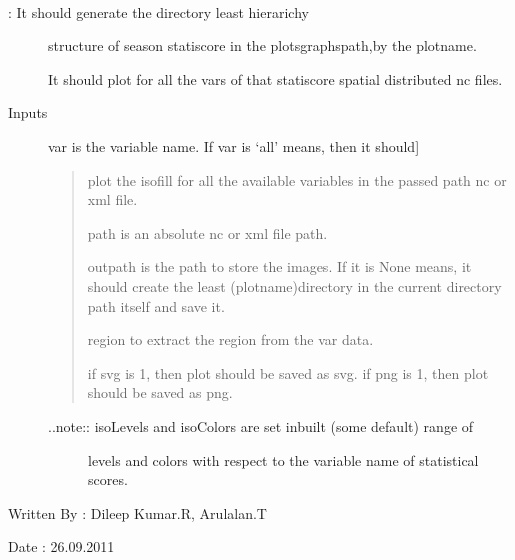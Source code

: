 \documentclass[letterpaper,10pt,english]{sphinxmanual}
\begin{document}
\begin{fulllineitems}
\label{diagnosis:generate_stati_score_spatial_distribution_plots.genIsoFillPlots}~\begin{description}
\item[{{\hyperref[diagnosis:generate_stati_score_spatial_distribution_plots.genIsoFillPlots]{}}: It should generate the directory least hierarichy}] \leavevmode
structure of season statiscore in the plotsgraphspath,by the plotname.

It should plot for all the vars of that statiscore spatial distributed
nc files.

\item[{Inputs}] \leavevmode{[}var is the variable name. If var is `all' means, then it should{]}\begin{quote}

plot the isofill for all the available variables in the passed
path nc or xml file.

path is an absolute nc or xml file path.

outpath is the path to store the images. If it is None means, it
should create the least (plotname)directory in the current
directory path itself and save it.

region to extract the region from the var data.

if svg is 1, then plot should be saved as svg.
if png is 1, then plot should be saved as png.
\end{quote}
\begin{description}
\item[{..note:: isoLevels and isoColors are set inbuilt (some default) range of}] \leavevmode
levels and colors with respect to the variable name of statistical
scores.

\end{description}

\end{description}

Written By : Dileep Kumar.R, Arulalan.T

Date : 26.09.2011

\end{fulllineitems}

\end{document}
